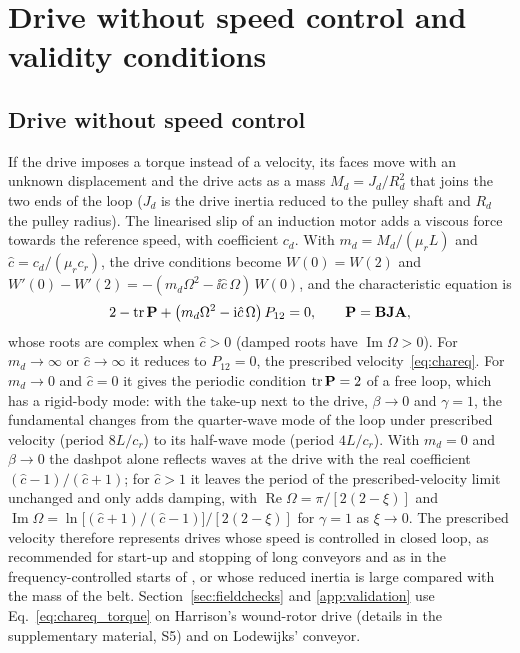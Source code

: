 \section{Drive without speed control and validity conditions}\label{app:driveandvalidity}

\subsection{Drive without speed control}\label{app:torque}\label{sec:torque}

If the drive imposes a torque instead of a velocity, its faces move with an unknown displacement
and the drive acts as a mass $M_d=J_d/R_d^2$ that joins the two ends of the loop ($J_d$ is the
drive inertia reduced to the pulley shaft and $R_d$ the pulley radius). The linearised slip of an
induction motor adds a viscous force towards the reference speed, with coefficient $c_d$. With
$m_d=M_d/(\mu_rL)$ and $\hat c=c_d/(\mu_rc_r)$, the drive conditions become $W(0)=W(2)$ and
$W'(0)-W'(2)=-(m_d\Omega^2-\ii\hat c\,\Omega)\,W(0)$, and the characteristic equation is
\begin{equation}\label{eq:chareq_torque}
  2-\operatorname{tr}\mathbf{P}+\left(m_d\Omega^2-\mathrm{i}\hat c\,\Omega\right)P_{12}=0,
  \qquad \mathbf{P}=\mathbf{B}\mathbf{J}\mathbf{A},
\end{equation}
whose roots are complex when $\hat c>0$ (damped roots have $\operatorname{Im}\Omega>0$). For
$m_d\to\infty$ or $\hat c\to\infty$ it reduces to $P_{12}=0$, the prescribed
velocity~\eqref{eq:chareq}. For $m_d\to0$ and $\hat c=0$ it gives the periodic condition
$\operatorname{tr}\mathbf{P}=2$ of a free loop, which has a rigid-body mode: with the take-up next to
the drive, $\beta\to0$ and $\gamma=1$, the fundamental changes from the quarter-wave mode of the
loop under prescribed velocity (period $8L/c_r$) to its half-wave mode (period $4L/c_r$). With
$m_d=0$ and $\beta\to0$ the dashpot alone reflects waves at the drive with the real coefficient
$(\hat c-1)/(\hat c+1)$; for $\hat c>1$ it leaves the period of the prescribed-velocity limit
unchanged and only adds damping, with $\operatorname{Re}\Omega=\pi/[2(2-\xi)]$ and
$\operatorname{Im}\Omega=\ln\bigl[(\hat c+1)/(\hat c-1)\bigr]/[2(2-\xi)]$ for $\gamma=1$ as
$\xi\to0$. The prescribed velocity therefore represents drives whose speed is controlled in
closed loop, as recommended for start-up and stopping of long conveyors \citep{jennings2013} and as
in the frequency-controlled starts of \citet[\S8.6.2]{lodewijks1996}, or whose reduced inertia is
large compared with the mass of the belt. Section~\ref{sec:fieldchecks} and \cref{app:validation} use
Eq.~\eqref{eq:chareq_torque} on Harrison's wound-rotor drive (details in the supplementary
material, S5) and on Lodewijks' conveyor.

